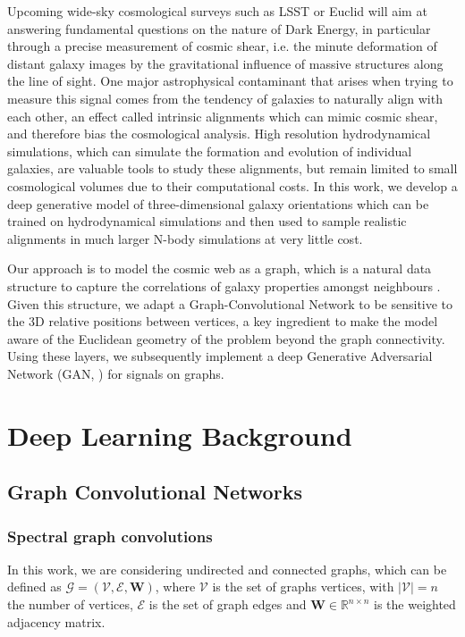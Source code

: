 \documentclass[a4paper,fleqn,usenatbib]{mnras}
\begin{document}
Upcoming wide-sky cosmological surveys such as LSST or Euclid will aim at answering fundamental questions on the 
nature of Dark Energy, in particular through a precise measurement of cosmic shear, i.e. the minute deformation of distant
galaxy images by the gravitational influence of massive structures along the line of sight. One major astrophysical contaminant
that arises when trying to measure this signal comes from the tendency of galaxies to naturally align with each other, an effect 
called  intrinsic alignments which can mimic cosmic shear, and therefore bias the cosmological analysis. High resolution
hydrodynamical simulations, which can simulate the formation and evolution of individual galaxies, are valuable tools 
to study these alignments, but remain limited to small cosmological volumes due to their computational costs. In this work,
we develop a deep generative model of three-dimensional galaxy orientations which can be trained on hydrodynamical
simulations and then used to sample realistic alignments in much larger N-body simulations at very little cost.

Our approach is to model the cosmic web as a graph, which is a natural data structure to capture the correlations of galaxy properties
amongst neighbours \cite{Coutinho2016}. Given this structure, we adapt a Graph-Convolutional Network \cite{Defferrard2016} to be sensitive
to the 3D relative positions between vertices, a key ingredient to make the model aware of the  Euclidean geometry of the problem beyond the graph connectivity. Using these layers, we subsequently implement a deep Generative Adversarial Network (GAN,  \cite{Goodfellow2014}) for signals on graphs.

\section{Deep Learning Background}

\subsection{Graph Convolutional Networks}

\subsubsection{Spectral graph convolutions}

In this work, we are considering undirected and connected graphs, which can be defined as  $\mathcal{G} = (\mathcal{V} , \mathcal{E}, \mathbf{W})$, where $\mathcal{V}$ is the set of graphs vertices, with $\left\vert \mathcal{V} \right\vert = n$ the number of vertices,  $\mathcal{E}$ is the set of graph edges and $\mathbf{W} \in \mathbb{R}^{n \times  n}$ is the weighted adjacency matrix.
\end{document}

